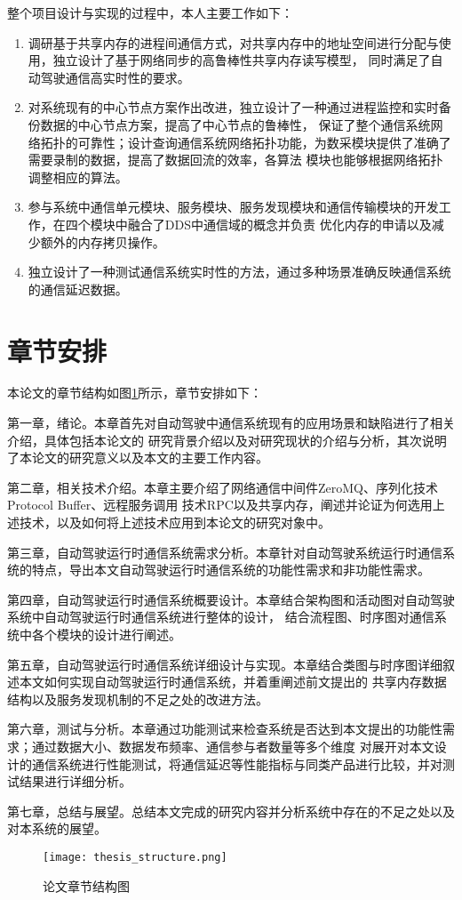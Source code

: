 整个项目设计与实现的过程中，本人主要工作如下：
\begin{enumerate}
  \item 调研基于共享内存的进程间通信方式，对共享内存中的地址空间进行分配与使用，独立设计了基于网络同步的高鲁棒性共享内存读写模型，
  同时满足了自动驾驶通信高实时性的要求。
  \item 对系统现有的中心节点方案作出改进，独立设计了一种通过进程监控和实时备份数据的中心节点方案，提高了中心节点的鲁棒性，
  保证了整个通信系统网络拓扑的可靠性；设计查询通信系统网络拓扑功能，为数采模块提供了准确了需要录制的数据，提高了数据回流的效率，各算法
  模块也能够根据网络拓扑调整相应的算法。
  \item 参与系统中通信单元模块、服务模块、服务发现模块和通信传输模块的开发工作，在四个模块中融合了DDS中通信域的概念并负责
  优化内存的申请以及减少额外的内存拷贝操作。
  \item 独立设计了一种测试通信系统实时性的方法，通过多种场景准确反映通信系统的通信延迟数据。
\end{enumerate}

\section{章节安排}
本论文的章节结构如图\ref{thesis_structure}所示，章节安排如下：

第一章，绪论。本章首先对自动驾驶中通信系统现有的应用场景和缺陷进行了相关介绍，具体包括本论文的
研究背景介绍以及对研究现状的介绍与分析，其次说明了本论文的研究意义以及本文的主要工作内容。

第二章，相关技术介绍。本章主要介绍了网络通信中间件ZeroMQ、序列化技术Protocol Buffer、远程服务调用
技术RPC以及共享内存，阐述并论证为何选用上述技术，以及如何将上述技术应用到本论文的研究对象中。

第三章，自动驾驶运行时通信系统需求分析。本章针对自动驾驶系统运行时通信系统的特点，导出本文自动驾驶运行时通信系统的功能性需求和非功能性需求。

第四章，自动驾驶运行时通信系统概要设计。本章结合架构图和活动图对自动驾驶系统中自动驾驶运行时通信系统进行整体的设计，
结合流程图、时序图对通信系统中各个模块的设计进行阐述。

第五章，自动驾驶运行时通信系统详细设计与实现。本章结合类图与时序图详细叙述本文如何实现自动驾驶运行时通信系统，并着重阐述前文提出的
共享内存数据结构以及服务发现机制的不足之处的改进方法。

第六章，测试与分析。本章通过功能测试来检查系统是否达到本文提出的功能性需求；通过数据大小、数据发布频率、通信参与者数量等多个维度
对展开对本文设计的通信系统进行性能测试，将通信延迟等性能指标与同类产品进行比较，并对测试结果进行详细分析。

第七章，总结与展望。总结本文完成的研究内容并分析系统中存在的不足之处以及对本系统的展望。

\begin{figure}[H]
  \centering
  \texttt{[image: thesis\_structure.png]}
  \caption{论文章节结构图}
  \label{thesis_structure}
\end{figure}






